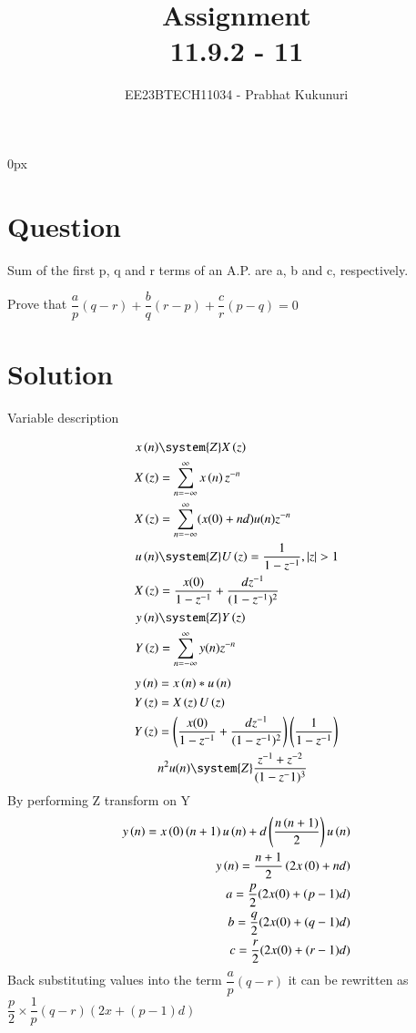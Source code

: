 \documentclass[journal,12pt,twocolumn]{IEEEtran}
\theoremstyle{remark}
\begin{document}
\parindent 0px


\vspace{3cm}

\title{Assignment\\[1ex]11.9.2 - 11}
\author{EE23BTECH11034 - Prabhat Kukunuri$^{}$%
}
\maketitle
\newpage
\bigskip

\renewcommand{\thefigure}{\theenumi}
\renewcommand{\thetable}{\theenumi}
\section*{Question}
Sum of the first p, q and r terms of an A.P. are a, b and c, respectively.

Prove that $\dfrac{a}{p}(q-r)+\dfrac{b}{q}(r-p)+\dfrac{c}{r}(p-q)=0$
\section*{Solution}
\begin{table}[h]
    \centering
    
    \caption{Variable description}
    \label{tab:11.9.2.11.1}
\end{table}
\begin{align}
	x \brak{n} &\system{Z} X \brak{z} \\
    X \brak{z} &= \sum_{n=-\infty}^{\infty} x \brak{n}   z^{-n}\\
    X \brak{z} & = \sum_{n=-\infty}^{\infty}(x(0)+nd)u(n)z^{-n}\\
    u \brak{n} &\system{Z} U \brak{z} = \dfrac{1}{1-z^{-1}}, |z|>1\\
    X \brak{z} & = \dfrac{x(0)}{1-z^{-1}} + \dfrac{dz^{-1}}{(1-z^{-1})^{2}}\\
    y \brak{n} &\system{Z} Y \brak{z}\\
    Y\brak{z}&=\sum_{n=-\infty}^{\infty}y(n)z^{-n}
\end{align}
\begin{align}
    y\brak{n}&=x\brak{n}\ast u\brak{n}\\
    Y\brak{z}&=X\brak{z}U\brak{z}\\
    Y\brak{z}&=\brak{\dfrac{x(0)}{1-z^{-1}} + \dfrac{dz^{-1}}{(1-z^{-1})^{2}}}\brak{\dfrac{1}{1-z^{-1}}}\\
    &n^2u(n)\system{Z} \dfrac{z^{-1}+z^{-2}}{(1-z^-1)^3}
 \end{align}
 By performing Z transform on Y
\begin{align}
    y\left(n\right)=x\left(0\right)\left(n+1\right)u\left(n\right)+d\left(\dfrac{{n\left(n+1\right)}}{2}\right)u\left(n\right)\\
    y\left(n\right)=\dfrac{n+1}{2}\left(2x\left(0\right)+nd\right)\\
    a=\dfrac{p}{2}(2x(0)+(p-1)d)\\
    b=\dfrac{q}{2}(2x(0)+(q-1)d)\\
    c=\dfrac{r}{2}(2x(0)+(r-1)d)
\end{align}
Back substituting values into the term $\dfrac{a}{p}(q-r)$ it can be rewritten as $\dfrac{p}{2} \times \dfrac{1}{p}(q-r)(2x+(p-1)d)$
\end{document}
